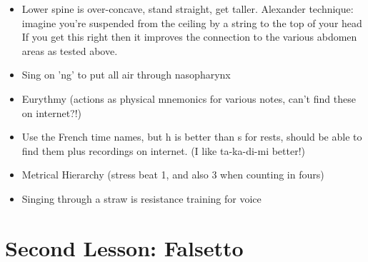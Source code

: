 \documentclass[14pt,a4paper]{memoir}
\begin{document}
\begin{itemize}
\item Lower spine is over-concave, stand straight, get taller.
Alexander technique: imagine you're suspended from the ceiling by a string to the top of your head
If you get this right then it improves the connection to the various abdomen areas as tested above.

\item Sing on 'ng' to put all air through nasopharynx

\item Eurythmy (actions as physical mnemonics for various notes, can't find these on internet?!)

\item Use the French time names, but h is better than s for rests, should be able to find them plus recordings on internet. (I like ta-ka-di-mi better!)

\item Metrical Hierarchy (stress beat 1, and also 3 when counting in fours)

\item Singing through a straw is resistance training for voice
  
\end{itemize}

\section*{Second Lesson: Falsetto}
\end{document}
